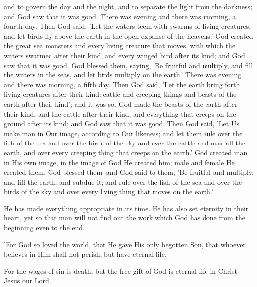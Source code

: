 \begin{scripture}[Genesis 1:18-28]
    and to govern the day and the night, and to separate the light from the darkness; and God saw that it was good.
    There was evening and there was morning, a fourth day.
    Then God said, 'Let the waters teem with swarms of living creatures, and let birds fly above the earth in the open expanse of the heavens.'
    God created the great sea monsters and every living creature that moves, with which the waters swarmed after their kind, and every winged bird after its kind; and God saw that it was good.
    God blessed them, saying, 'Be fruitful and multiply, and fill the waters in the seas, and let birds multiply on the earth.'
    There was evening and there was morning, a fifth day.
    Then God said, 'Let the earth bring forth living creatures after their kind: cattle and creeping things and beasts of the earth after their kind'; and it was so.
    God made the beasts of the earth after their kind, and the cattle after their kind, and everything that creeps on the ground after its kind; and God saw that it was good.
    Then God said, 'Let Us make man in Our image, according to Our likeness; and let them rule over the fish of the sea and over the birds of the sky and over the cattle and over all the earth, and over every creeping thing that creeps on the earth.'
    God created man in His own image, in the image of God He created him; male and female He created them.
    God blessed them; and God said to them, 'Be fruitful and multiply, and fill the earth, and subdue it; and rule over the fish of the sea and over the birds of the sky and over every living thing that moves on the earth.'
\end{scripture}

\begin{scripture}[Ecclesiastes 3:11]
    He has made everything appropriate in its time. He has also set eternity in their heart, yet so that man will not find out the work which God has done from the beginning even to the end.
\end{scripture}

\begin{scripture}[John 3:16]
    'For God so loved the world, that He gave His only begotten Son, that whoever believes in Him shall not perish, but have eternal life.
\end{scripture}

\begin{scripture}[Romans 6:23]
    For the wages of sin is death, but the free gift of God is eternal life in Christ Jesus our Lord.
\end{scripture}

